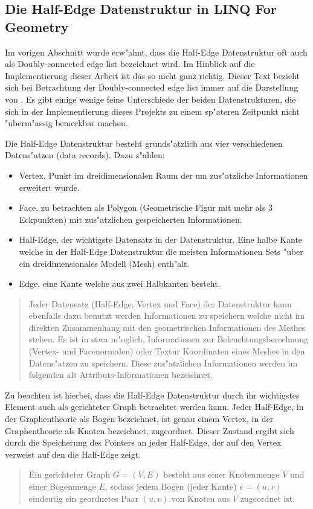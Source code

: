 \documentclass[pagesize, paper=a4, fontsize=12pt,titlepage=true, headings=small, headnosepline, abstractoff, liststotoc, nochapterprefix, plainheadsepline]{scrreprt}
\newcommand{\LFGS}{LINQ For Geometry }
\newcommand{\HES}{Half-Edge Datenstruktur }
\begin{document}
		\subsection {Die Half-Edge Datenstruktur in \LFGS}
			Im vorigen Abschnitt wurde erw"ahnt, dass die \HES oft auch als Doubly-connected edge list bezeichnet wird. Im Hinblick auf die Implementierung dieser Arbeit ist das so nicht ganz richtig. Dieser Text bezieht sich bei Betrachtung der Doubly-connected edge list immer auf die Darstellung von \cite{vanMarkdeBerg.2008}. Es gibt einige wenige feine Unterschiede der beiden Datenstrukturen, die sich in der Implementierung dieses Projekts zu einem sp"ateren Zeitpunkt nicht "uberm"assig bemerkbar machen.

Die \HES besteht grunds"atzlich aus vier verschiedenen Datens"atzen (data records). Dazu z"ahlen:
\begin{itemize}
\item Vertex, Punkt im dreidimensionalen Raum der um zus"atzliche Informationen erweitert wurde. 
\item Face, zu betrachten als Polygon (Geometrische Figur mit mehr als 3 Eckpunkten) mit zus"atzlichen gespeicherten Informationen.
\item Half-Edge, der wichtigste Datensatz in der Datenstruktur. Eine halbe Kante welche in der \HES die meisten Informationen Sets "uber ein dreidimensionales Modell (Mesh) enth"alt.
\item Edge, eine Kante welche aus zwei Halbkanten besteht.
\end{itemize}

\begin{quote}Jeder Datensatz (Half-Edge, Vertex und Face) der Datenstruktur kann ebenfalls dazu benutzt werden Informationen zu speichern welche nicht im direkten Zusammenhang mit den geometrischen Informationen des Meshes stehen. Es ist in etwa m"oglich, Informationen zur Beleuchtungsberechnung (Vertex- und Facenormalen) oder Textur Koordinaten eines Meshes in den Datens"atzen zu speichern. Diese zus"atzlichen Informationen werden im folgenden als Attributs-Informationen bezeichnet. \cite[S.~31]{vanMarkdeBerg.2008}\end{quote}

Zu beachten ist hierbei, dass die \HES durch ihr wichtigstes Element auch als gerichteter Graph betrachtet werden kann. Jeder Half-Edge, in der Graphentheorie als Bogen bezeichnet, ist genau einem Vertex, in der Graphentheorie als Knoten bezeichnet, zugeordnet. Dieser Zustand ergibt sich durch die Speicherung des Pointers an jeder Half-Edge, der auf den Vertex verweist auf den die Half-Edge zeigt.
\begin{quote}Ein gerichteter Graph \(G = (V,E)\) besteht aus einer Knotenmenge \(V\) und einer Bogenmenge \(E\), sodass jedem Bogen (jeder Kante) \(e = (u,v)\) eindeutig ein geordnetes Paar \((u,v)\) von Knoten aus \(V\) zugeordnet ist. \cite[S.~127]{Tittmann.2011}\end{quote}
\end{document}
